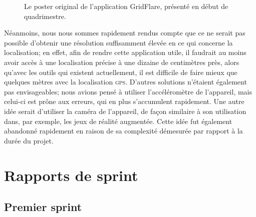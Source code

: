 \documentclass{elsarticle}
\begin{document}
\begin{figure}[!htbp]
	\centering
	\caption{Le poster original de l'application GridFlare, présenté en début de quadrimestre.}
	\label{fig:poster}
\end{figure}

Néanmoins, nous nous sommes rapidement rendus compte que ce ne serait pas possible d'obtenir une résolution suffisamment élevée en ce qui concerne la localisation; en effet, afin de rendre cette application utile, il faudrait au moins avoir accès à une localisation précise à une dizaine de centimètres près, alors qu'avec les outils qui existent actuellement, il est difficile de faire mieux que quelques mètres avec la localisation \textsc{gps}.
D'autres solutions n'étaient également pas envisageables; nous avions pensé à utiliser l'accéléromètre de l'appareil, mais celui-ci est prône aux erreurs, qui en plus s'accumulent rapidement.
Une autre idée serait d'utiliser la caméra de l'appareil, de façon similaire à son utilisation dans, par exemple, les jeux de réalité augmentée.
Cette idée fut également abandonné rapidement en raison de sa complexité démesurée par rapport à la durée du projet.

\section{Rapports de sprint}
\subsection{Premier sprint}
\end{document}
